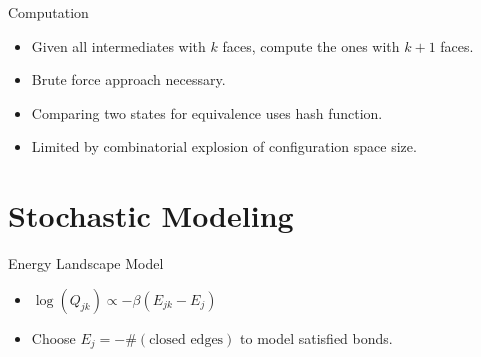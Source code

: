 \documentclass{beamer}
\begin{document}
\begin{frame}{Computation}
\begin{itemize}
\item Given all intermediates with $k$ faces, compute the ones with $k+1$ faces.
\item Brute force approach necessary.  
\item Comparing two states for equivalence uses hash function. 
\item Limited by combinatorial explosion of configuration space size.
\end{itemize}
\end{frame}

\section{Stochastic Modeling}
\begin{frame}{Energy Landscape Model}
  \centering
\begin{itemize}
\item $\log\left(Q_{jk} \right) \propto -\beta(E_{jk} - E_j)$
\item Choose $E_j = -\#\left(\text{closed edges}\right)$ to model satisfied bonds.
\end{itemize} 
\end{frame}
\end{document}
